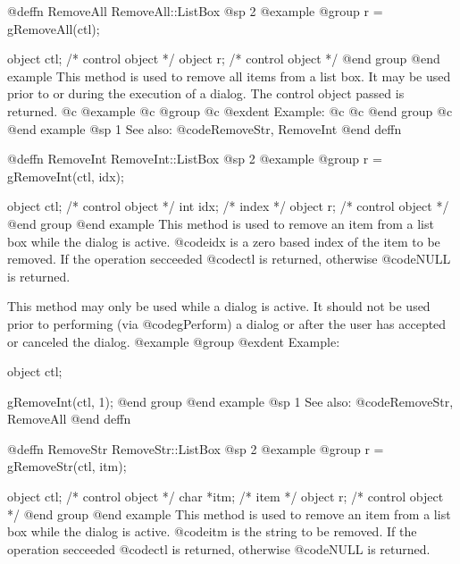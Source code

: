 @deffn {RemoveAll} RemoveAll::ListBox
@sp 2
@example
@group
r = gRemoveAll(ctl);

object  ctl;    /*  control object  */
object  r;      /*  control object  */
@end group
@end example
This method is used to remove all items from a list box.  It may be used
prior to or during the execution of a dialog.  The control object passed
is returned.
@c @example
@c @group
@c @exdent Example:
@c 
@c @end group
@c @end example
@sp 1
See also:  @code{RemoveStr, RemoveInt}
@end deffn
















@deffn {RemoveInt} RemoveInt::ListBox
@sp 2
@example
@group
r = gRemoveInt(ctl, idx);

object  ctl;    /*  control object  */
int     idx;    /*  index           */
object  r;      /*  control object  */
@end group
@end example
This method is used to remove an item from a list box while the dialog
is active.  @code{idx} is a zero based index of the item to be removed.
If the operation secceeded @code{ctl} is returned, otherwise @code{NULL}
is returned.

This method may only be used while a dialog is active.  It should not be
used prior to performing (via @code{gPerform}) a dialog or after the user
has accepted or canceled the dialog.
@example
@group
@exdent Example:

object  ctl;

gRemoveInt(ctl, 1);
@end group
@end example
@sp 1
See also:  @code{RemoveStr, RemoveAll}
@end deffn














@deffn {RemoveStr} RemoveStr::ListBox
@sp 2
@example
@group
r = gRemoveStr(ctl, itm);

object  ctl;    /*  control object  */
char   *itm;    /*  item            */
object  r;      /*  control object  */
@end group
@end example
This method is used to remove an item from a list box while the dialog
is active.  @code{itm} is the string to be removed.
If the operation secceeded @code{ctl} is returned, otherwise @code{NULL}
is returned.

